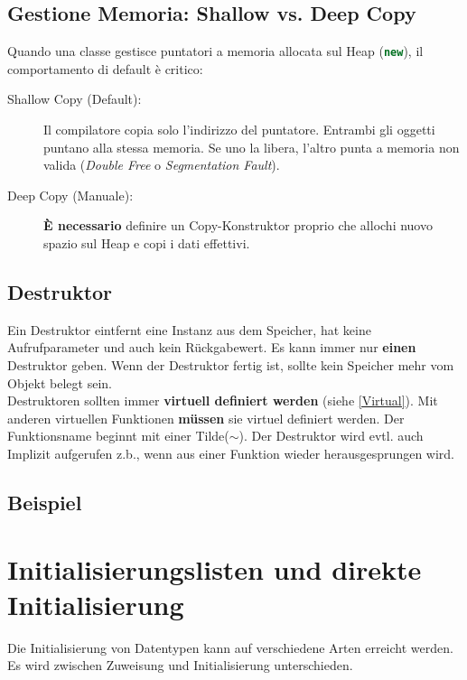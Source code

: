 \subsection{Gestione Memoria: Shallow vs. Deep Copy}

Quando una classe gestisce puntatori a memoria allocata sul Heap (\lstinline[language=C++]|new|), il comportamento di default è critico:

\begin{description}
    \item[Shallow Copy (Default):] Il compilatore copia solo l'indirizzo del puntatore. Entrambi gli oggetti puntano alla stessa memoria. Se uno la libera, l'altro punta a memoria non valida (\textit{Double Free} o \textit{Segmentation Fault}).
    \item[Deep Copy (Manuale):] \textbf{\color{red}È necessario} definire un Copy-Konstruktor proprio che allochi nuovo spazio sul Heap e copi i dati effettivi.
\end{description}

\subsection{Destruktor}

Ein Destruktor eintfernt eine Instanz aus dem Speicher, 
hat keine Aufrufparameter und auch kein Rückgabewert. 
Es kann immer nur \textbf{einen} Destruktor geben. 
Wenn der Destruktor fertig ist, sollte kein Speicher mehr vom Objekt belegt sein.\\
Destruktoren sollten immer \textbf{virtuell definiert werden} (siehe \ref{Virtual}). 
Mit anderen virtuellen Funktionen \textbf{müssen} sie virtuel definiert werden. 
Der Funktionsname beginnt mit einer Tilde($\sim$). 
Der Destruktor wird evtl. auch Implizit aufgerufen z.b., wenn aus einer Funktion wieder herausgesprungen wird. 

\subsection{Beispiel}\label{chap:ctor_dtor_example}



\section{Initialisierungslisten und direkte Initialisierung}

Die Initialisierung von Datentypen kann auf verschiedene Arten erreicht werden. 
Es wird zwischen Zuweisung und Initialisierung unterschieden.

